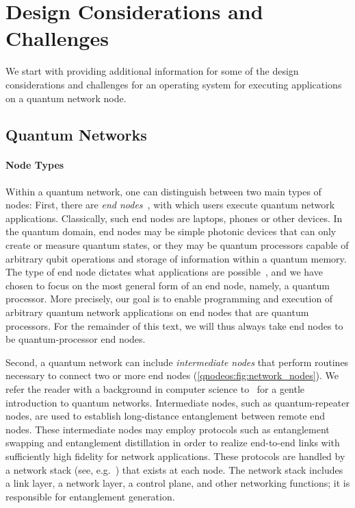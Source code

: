 \section{Design Considerations and Challenges}
\label{qnodeos:sec:design-consid:challenges}

We start with providing additional information for some of the design considerations and challenges for an operating system for executing applications on a quantum network node.

\subsection{Quantum Networks}
\label{qnodeos:sec:quantum-networks}

\paragraph{Node Types}

Within a quantum network, one can distinguish between two main types of nodes: First, there are \emph{end nodes}~\cite{wehner_2018_stages}, with which users execute quantum network applications. Classically, such end nodes are laptops, phones or other devices. In the quantum domain, end nodes may be simple photonic devices that can only create or measure quantum states, or they may be quantum processors capable of arbitrary qubit operations and storage of information within a quantum memory. The type of end node dictates what applications are possible~\cite{wehner_2018_stages}, and we have chosen to focus on the most general form of an end node, namely, a quantum processor. More precisely, our goal is to enable programming and execution of arbitrary quantum network applications on end nodes that are quantum processors. For the remainder of this text, we will thus always take end nodes to be quantum-processor end nodes.

Second, a quantum network can include \emph{intermediate nodes} that perform routines necessary to connect two or more end nodes (\cref{qnodeos:fig:network_nodes}).
We refer the reader with a background in computer science to~\cite{vanMeter_book} for a gentle introduction to quantum networks. 
Intermediate nodes, such as quantum-repeater nodes, are used to establish long-distance entanglement between remote end nodes. These intermediate nodes may employ protocols such as entanglement swapping and entanglement distillation in order to realize end-to-end links with sufficiently high fidelity for network applications. These protocols are handled by a network stack (see, e.g.~\cite{dahlberg_2019_egp}) that exists at each node. The network stack includes a link layer, a network layer, a control plane, and other networking functions; it is responsible for entanglement generation.

